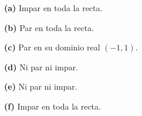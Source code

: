 \noindent\textbf{(a)} Impar en toda la recta.

\noindent\textbf{(b)} Par en toda la recta.

\noindent\textbf{(c)} Par en su dominio real \((-1,1)\).

\noindent\textbf{(d)} Ni par ni impar.

\noindent\textbf{(e)} Ni par ni impar.

\noindent\textbf{(f)} Impar en toda la recta.
